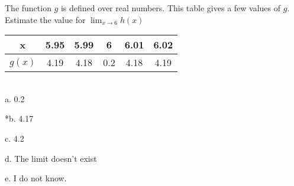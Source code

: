 
The function \(g\) is defined over real numbers. This table gives a
few values of \(g\). Estimate the value for
$\displaystyle \lim_{x \rightarrow 6}h(x)$

\begin{tabular}{|c|c|c|c|c|c|}
\hline
x        & 5.95 & 5.99 & 6   & 6.01 & 6.02 \\ \hline
\(g(x)\) & 4.19 & 4.18 & 0.2 & 4.18 & 4.19 \\ \hline
\end{tabular}
\\

a. 0.2

*b. 4.17

c. 4.2

d. The limit doesn't exist

e. I do not know.\\
